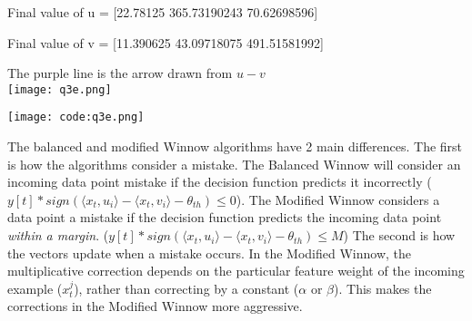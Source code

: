 \documentclass{article}
\begin{document}
Final value of u = [22.78125    365.73190243  70.62698596]

Final value of v = [11.390625    43.09718075 491.51581992]

The purple line is the arrow drawn from \(u - v\)\\
\texttt{[image: q3e.png]}

\texttt{[image: code:q3e.png]}

The balanced and modified Winnow algorithms have 2 main differences. The first is
how the algorithms consider a mistake. The Balanced Winnow will consider an incoming 
data point mistake if the decision function predicts it incorrectly 
(\(y[t] * sign(\langle x_{t}, u_{i} \rangle - \langle x_{t}, v_{i} \rangle - \theta_{th}) \leq 0\)).
The Modified Winnow considers a data point a mistake if the decision function predicts
the incoming data point \emph{within a margin}. 
(\(y[t] * sign(\langle x_{t}, u_{i} \rangle - \langle x_{t}, v_{i} \rangle - \theta_{th}) \leq M\))
The second is how the vectors update when a mistake occurs. In the Modified Winnow, the multiplicative correction 
depends on the particular feature weight of the incoming example (\(x_{t}^{j}\)), rather than 
correcting by a constant (\(\alpha\) or \(\beta\)). This makes the corrections
in the Modified Winnow more aggressive.
\end{document}
